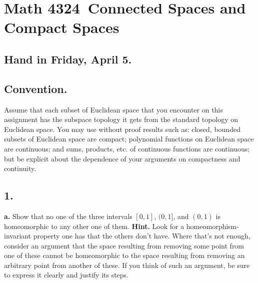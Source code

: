 \documentclass{amsart}
\theoremstyle{plain}
\theoremstyle{definition}
\theoremstyle{remark}
\begin{document}
\section*{Math 4324\  Connected Spaces and Compact Spaces } 

\subsection*{Hand in Friday, April 5.} 

\vspace{.15in}
\subsection*{Convention.} Assume that each subset of Euclidean space that you encounter on this assignment has the subspace topology it gets from the standard topology on Euclidean space. You may use without proof results such as: closed, bounded subsets of Euclidean space are compact; polynomial functions on Euclidean space are continuous; and sums, products, etc. of continuous functions are continuous; but be explicit about the dependence of your arguments on compactness and continuity. 

\vspace{.15in}
\noindent
\subsection*{1.}  

{\bfseries a.}  Show that no one of the three intervals $[0,1]$, $(0,1]$, and $(0,1)$ is homeomorphic to any other one of them. {\bfseries Hint.} Look for a homeomorphism-invariant property one has that the others don't have. Where that's not enough, consider an argument that the space resulting from removing some point from one of these cannot be homeomorphic to the space resulting from removing an arbitrary point from another of these. If you think of such an argument, be sure to express it clearly and justify its steps. 
\end{document}
